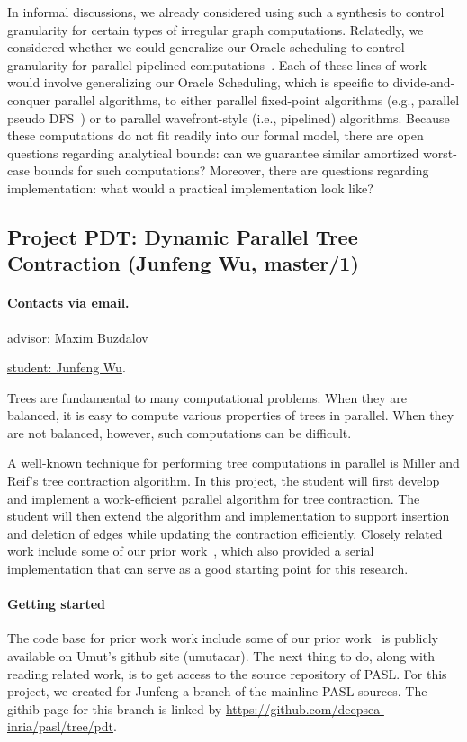 \documentclass[11pt]{article}
\newcommand{\email}[2]{\href{mailto:#2}{#1}}
\begin{document}
In informal discussions, we already considered using such a synthesis
to control granularity for certain types of irregular graph
computations.  Relatedly, we considered whether we could generalize
our Oracle scheduling to control granularity for parallel pipelined
computations~\cite{lee2013fly}.  Each of these lines of work would
involve generalizing our Oracle Scheduling, which is specific to
divide-and-conquer parallel algorithms, to either parallel fixed-point
algorithms (e.g., parallel pseudo DFS~\cite{CongKoKrLeSa08}) or to
parallel wavefront-style (i.e., pipelined) algorithms.  Because these
computations do not fit readily into our formal model, there are open
questions regarding analytical bounds: can we guarantee similar
amortized worst-case bounds for such computations?  Moreover, there
are questions regarding implementation: what would a practical
implementation look like?

\subsection{Project  PDT: Dynamic Parallel Tree Contraction (Junfeng
  Wu, master/1)}


\paragraph{Contacts via email.}
\email{advisor: Maxim Buzdalov}{mbuzdalov@gmail.com}

\email{student: Junfeng Wu}{fengone7@gmail.com}.

Trees are fundamental to many computational problems. When they are
balanced, it is easy to compute various properties of trees in
parallel.  When they are not balanced, however, such computations can
be difficult.

A well-known technique for performing tree computations in parallel is
Miller and Reif's tree contraction algorithm.  In this project, the
student will first develop and implement a work-efficient parallel
algorithm for tree contraction.  The student will then extend the
algorithm and implementation to support insertion and deletion of
edges while updating the contraction efficiently.  Closely related
work include some of our prior work~\cite{AcarBlHaViWo04,AcarBlVi05},
which also provided a serial implementation that can serve as a good
starting point for this research.

\paragraph{Getting started}
The code base for prior work work include some of our prior
work~\cite{AcarBlHaViWo04,AcarBlVi05} is publicly available on Umut's
github site (umutacar).  The next thing to do, along with reading
related work, is to get access to the source repository of PASL. For
this project, we created for Junfeng a branch of the mainline PASL
sources.  The githib page for this branch is linked by
\url{https://github.com/deepsea-inria/pasl/tree/pdt}.
\end{document}
